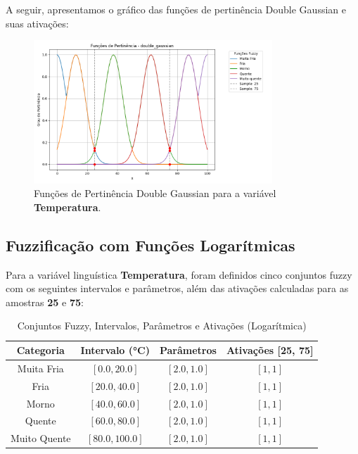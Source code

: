\documentclass[a4paper,12pt]{article}
\begin{document}
A seguir, apresentamos o gráfico das funções de pertinência Double Gaussian e suas ativações:

\begin{figure}[H]
    \centering
    \includegraphics[width=0.8\textwidth]{img/funções_de_pertinência_double_gaussian_fuzzificado.png}
    \caption{Funções de Pertinência Double Gaussian para a variável \textbf{Temperatura}.}
\end{figure}

\subsection{Fuzzificação com Funções Logarítmicas}

Para a variável linguística \textbf{Temperatura}, foram definidos cinco conjuntos fuzzy com os seguintes intervalos e parâmetros, além das ativações calculadas para as amostras \textbf{25} e \textbf{75}:

\begin{table}[H]
\centering
\caption{Conjuntos Fuzzy, Intervalos, Parâmetros e Ativações (Logarítmica)}
\begin{tabular}{|c|c|c|c|}
\hline
\textbf{Categoria}    & \textbf{Intervalo (°C)} & \textbf{Parâmetros}       & \textbf{Ativações [25, 75]} \\ \hline
Muita Fria            & $[0.0, 20.0]$          & $[2.0, 1.0]$              & $[1, 1]$                   \\ \hline
Fria                  & $[20.0, 40.0]$         & $[2.0, 1.0]$              & $[1, 1]$                   \\ \hline
Morno                 & $[40.0, 60.0]$         & $[2.0, 1.0]$              & $[1, 1]$                   \\ \hline
Quente                & $[60.0, 80.0]$         & $[2.0, 1.0]$              & $[1, 1]$                   \\ \hline
Muito Quente          & $[80.0, 100.0]$        & $[2.0, 1.0]$              & $[1, 1]$                   \\ \hline
\end{tabular}
\end{table}
\end{document}

